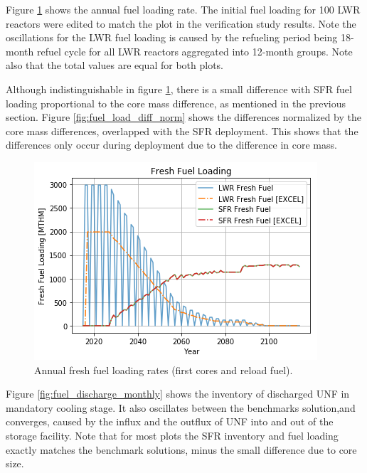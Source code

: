 Figure \ref{fig:fuel_load} shows the annual fuel loading rate.
The initial fuel loading for 100 \gls{LWR} reactors were edited to match
the plot in the verification
study results. Note the oscillations for the \gls{LWR} fuel loading
is caused by the refueling period being 18-month refuel cycle for all \gls{LWR} reactors
aggregated into 12-month groups. Note also that the total values
are equal for both plots.

Although indistinguishable in figure \ref{fig:fuel_load},
there is a small difference with \gls{SFR} fuel loading proportional
to the core mass difference, as mentioned in the previous section.
Figure \ref{fig:fuel_load_diff_norm} shows the
differences normalized by the core mass differences, overlapped with the
\gls{SFR} deployment. This shows that the differences only occur during
deployment due to the difference in core mass.


\begin{figure}[htbp!]
    \begin{center}
        \includegraphics[scale=0.5]{./images/results_18/fuel_load.png}
    \end{center}
        \caption{Annual fresh fuel loading rates (first cores and reload fuel).}
    \label{fig:fuel_load}
\end{figure}

Figure \ref{fig:fuel_discharge_monthly} shows the inventory of discharged
\gls{UNF} in mandatory cooling stage. It also oscillates between the benchmarks
solution,and converges, caused by the influx and the outflux of \gls{UNF}
into and out of the storage facility.
Note that for most plots the \gls{SFR} inventory and fuel loading
exactly matches the benchmark solutions, minus the small difference due to core
size.

